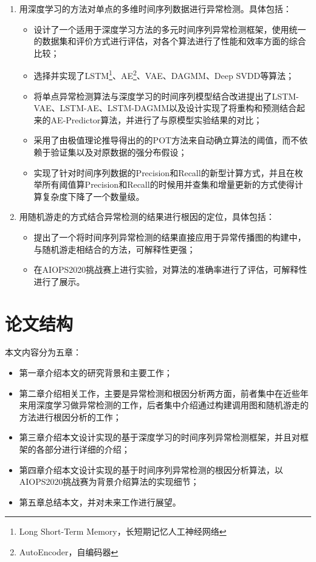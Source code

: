 \begin{enumerate}
    \item 用深度学习的方法对单点的多维时间序列数据进行异常检测。具体包括：
        \begin{itemize}
        \item 设计了一个适用于深度学习方法的多元时间序列异常检测框架，使用统一的数据集和评价方式进行评估，对各个算法进行了性能和效率方面的综合比较；
        \item 选择并实现了LSTM\footnote{Long Short-Term Memory，长短期记忆人工神经网络}、AE\footnote{AutoEncoder，自编码器}、VAE\cite{an2015variational}、DAGMM\cite{zong2018deep}、Deep SVDD\cite{ruff2018deep}等算法；
        \item 将单点异常检测算法与深度学习的时间序列模型结合改进提出了LSTM-VAE、LSTM-AE、LSTM-DAGMM以及设计实现了将重构和预测结合起来的AE-Predictor算法，并进行了与原模型实验结果的对比；
        \item 采用了由极值理论推导得出的的POT\cite{siffer2017anomaly}方法来自动确立算法的阈值，而不依赖于验证集以及对原数据的强分布假设；
        \item 实现了针对时间序列数据的Precision和Recall的新型计算方式\cite{tatbul2018precision}，并且在枚举所有阈值算Precision和Recall的时候用并查集和增量更新的方式使得计算复杂度下降了一个数量级。
        \end{itemize}
    \item 用随机游走的方式结合异常检测的结果进行根因的定位，具体包括：
        \begin{itemize}
        \item 提出了一个将时间序列异常检测的结果直接应用于异常传播图的构建中，与随机游走相结合的方法，可解释性更强；
        \item 在AIOPS2020挑战赛上进行实验，对算法的准确率进行了评估，可解释性进行了展示。
        \end{itemize}
\end{enumerate}
\section{论文结构}
本文内容分为五章：
\begin{itemize}
    \item 第一章介绍本文的研究背景和主要工作；
    \item 第二章介绍相关工作，主要是异常检测和根因分析两方面，前者集中在近些年来用深度学习做异常检测的工作，后者集中介绍通过构建调用图和随机游走的方法进行根因分析的工作；
    \item 第三章介绍本文设计实现的基于深度学习的时间序列异常检测框架，并且对框架的各部分进行详细的介绍；
    \item 第四章介绍本文设计实现的基于时间序列异常检测的根因分析算法，以AIOPS2020挑战赛为背景介绍算法的实现细节；
    \item 第五章总结本文，并对未来工作进行展望。
\end{itemize}